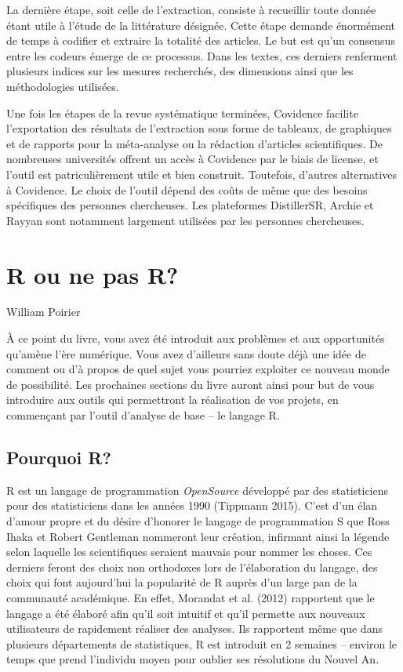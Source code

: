 \documentclass[
  letterpaper,
]{scrbook}
\begin{document}
La dernière étape, soit celle de l'extraction, consiste à recueillir
toute donnée étant utile à l'étude de la littérature désignée. Cette
étape demande énormément de temps à codifier et extraire la totalité des
articles. Le but est qu'un consensus entre les codeurs émerge de ce
processus. Dans les textes, ces derniers renferment plusieurs indices
sur les mesures recherchés, des dimensions ainsi que les méthodologies
utilisées.

Une fois les étapes de la revue systématique terminées, Covidence
facilite l'exportation des résultats de l'extraction sous forme de
tableaux, de graphiques et de rapports pour la méta-analyse ou la
rédaction d'articles scientifiques. De nombreuses universités offrent un
accès à Covidence par le biais de license, et l'outil est
patriculièrement utile et bien construit. Toutefois, d'autres
alternatives à Covidence. Le choix de l'outil dépend des coûts de même
que des besoins spécifiques des personnes chercheuses. Les plateformes
DistillerSR, Archie et Rayyan sont notamment largement utilisées par les
personnes chercheuses.


\hypertarget{r-ou-ne-pas-r}{%
\chapter{R ou ne pas R?}\label{r-ou-ne-pas-r}}

\begin{flushright}
William Poirier
\end{flushright}

À ce point du livre, vous avez été introduit aux problèmes et aux
opportunités qu'amène l'ère numérique. Vous avez d'ailleurs sans doute
déjà une idée de comment ou d'à propos de quel sujet vous pourriez
exploiter ce nouveau monde de possibilité. Les prochaines sections du
livre auront ainsi pour but de vous introduire aux outils qui
permettront la réalisation de vos projets, en commençant par l'outil
d'analyse de base -- le langage R.

\hypertarget{pourquoi-r}{%
\section{Pourquoi R?}\label{pourquoi-r}}

R est un langage de programmation \emph{OpenSource} développé par des
statisticiens pour des statisticiens dans les années 1990 (Tippmann
2015). C'est d'un élan d'amour propre et du désire d'honorer le langage
de programmation S que Ross Ihaka et Robert Gentleman nommeront leur
création, infirmant ainsi la légende selon laquelle les scientifiques
seraient mauvais pour nommer les choses. Ces derniers feront des choix
non orthodoxes lors de l'élaboration du langage, des choix qui font
aujourd'hui la popularité de R auprès d'un large pan de la communauté
académique. En effet, Morandat et al. (2012) rapportent que le langage a
été élaboré afin qu'il soit intuitif et qu'il permette aux nouveaux
utilisateurs de rapidement réaliser des analyses. Ils rapportent même
que dans plusieurs départements de statistiques, R est introduit en 2
semaines -- environ le temps que prend l'individu moyen pour oublier ses
résolutions du Nouvel An.
\end{document}
